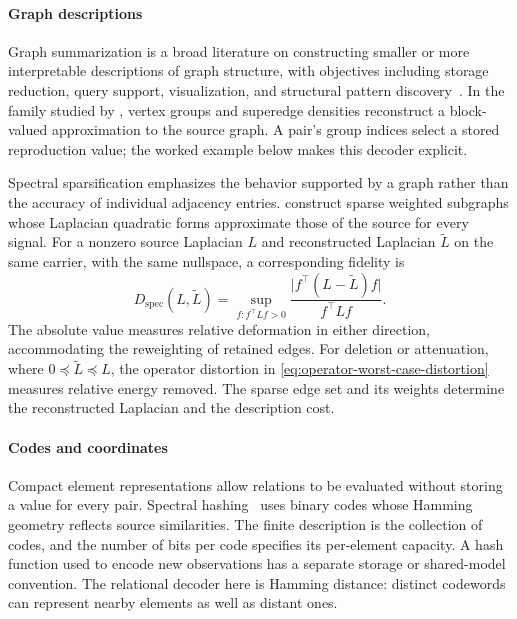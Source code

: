 \paragraph{Graph descriptions}
Graph summarization is a broad literature on constructing smaller or more interpretable descriptions of graph structure, with objectives including storage reduction, query support, visualization, and structural pattern discovery~\citep{liu2018graph,shabani2024comprehensive}.
In the family studied by \citet{riondato2017graph}, vertex groups and superedge densities reconstruct a block-valued approximation to the source graph.
A pair's group indices select a stored reproduction value; the worked example below makes this decoder explicit.

Spectral sparsification emphasizes the behavior supported by a graph rather than the accuracy of individual adjacency entries.
\citet{spielman2011effective} construct sparse weighted subgraphs whose Laplacian quadratic forms approximate those of the source for every signal.
For a nonzero source Laplacian $L$ and reconstructed Laplacian $\widetilde L$ on the same carrier, with the same nullspace, a corresponding fidelity is
\begin{equation}
D_{\mathrm{spec}}(L,\widetilde L)
=\sup_{f:f^\top Lf>0}
\frac{\bigl|f^\top(L-\widetilde L)f\bigr|}{f^\top Lf}.
\end{equation}
The absolute value measures relative deformation in either direction, accommodating the reweighting of retained edges.
For deletion or attenuation, where $0\preceq\widetilde L\preceq L$, the operator distortion in \cref{eq:operator-worst-case-distortion} measures relative energy removed.
The sparse edge set and its weights determine the reconstructed Laplacian and the description cost.

\paragraph{Codes and coordinates}
Compact element representations allow relations to be evaluated without storing a value for every pair.
Spectral hashing~\citep{weiss2008spectral} uses binary codes whose Hamming geometry reflects source similarities.
The finite description is the collection of codes, and the number of bits per code specifies its per-element capacity.
A hash function used to encode new observations has a separate storage or shared-model convention.
The relational decoder here is Hamming distance: distinct codewords can represent nearby elements as well as distant ones.

